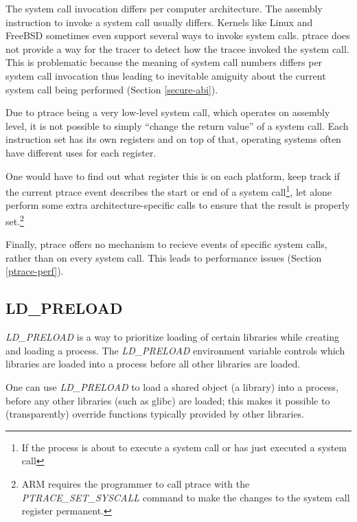 \documentclass[a4paper, 10pt]{report}
\begin{document}
The system call invocation differs per computer architecture.
The assembly instruction to invoke a system call usually differs.
Kernels like Linux and FreeBSD sometimes even support several ways to invoke
system calls. ptrace does not provide a way for the tracer to detect how
the tracee invoked the system call. This is problematic because the meaning
of system call numbers differs per system call invocation thus leading to
inevitable amiguity about the current system call being performed (Section
\ref{secure-abi}).

Due to ptrace being a very low-level system call, which operates on assembly
level, it is not possible to simply ``change the return value'' of a system
call. Each instruction set has its own registers and on top of that, operating
systems often have different uses for each register.

One would have to find out what register this is on each platform,
keep track if the current ptrace event describes the start or end of a system
call\footnote{If the process is about to execute a system call or has just
executed a system call}, let alone perform some extra architecture-specific
calls to ensure that the result is properly set.\footnote{ARM requires
the programmer to call ptrace with the \textit{PTRACE\_SET\_SYSCALL} command
to make the changes to the system call register permanent.}

Finally, ptrace offers no mechanism to recieve events of specific system calls,
rather than on every system call. This leads to performance issues (Section
\ref{ptrace-perf}).

\subsection{LD\_PRELOAD}
% 

\textit{LD\_PRELOAD} is a way to prioritize loading of certain libraries
while creating and loading a process. The \textit{LD\_PRELOAD} environment
variable controls which libraries are loaded into a process before all
other libraries are loaded.

One can use \textit{LD\_PRELOAD} to load a shared object (a library)
into a process, before any other libraries (such as glibc) are loaded;
this makes it possible to (transparently) override functions typically
provided by other libraries.
\end{document}
